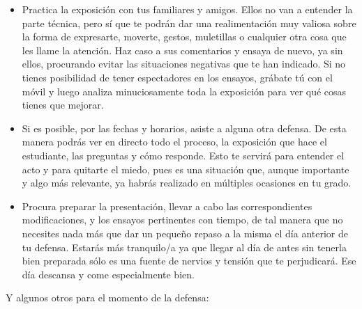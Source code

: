 \begin{itemize}
    \item Practica la exposición con tus familiares y amigos. Ellos no van a entender la parte técnica, pero sí que te podrán dar una realimentación muy valiosa sobre la forma de expresarte, moverte, gestos, muletillas o cualquier otra cosa que les llame la atención. Haz caso a sus comentarios y ensaya de nuevo, ya sin ellos, procurando evitar las situaciones negativas que te han indicado. Si no tienes posibilidad de tener espectadores en los ensayos, grábate tú con el móvil y luego analiza minuciosamente toda la exposición para ver qué cosas tienes que mejorar.

    \item Si es posible, por las fechas y horarios, asiste a alguna otra defensa. De esta manera podrás ver en directo todo el proceso, la exposición que hace el estudiante, las preguntas y cómo responde. Esto te servirá para entender el acto y para quitarte el miedo, pues es una situación que, aunque importante y algo más relevante, ya habrás realizado en múltiples ocasiones en tu grado.

    \item Procura preparar la presentación, llevar a cabo las correspondientes modificaciones, y los ensayos pertinentes con tiempo, de tal manera que no necesites nada más que dar un pequeño repaso a la misma el día anterior de tu defensa. Estarás más tranquilo/a ya que llegar al día de antes sin tenerla bien preparada sólo es una fuente de nervios y tensión que te perjudicará. Ese día descansa y come especialmente bien. 
    
\end{itemize}

Y algunos otros para el momento de la defensa:

